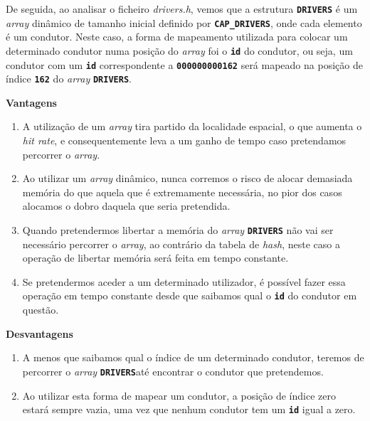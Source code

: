 \documentclass[12pt,a4paper]{report}
\begin{document}
De seguida, ao analisar o ficheiro \textit{drivers.h}, vemos que a estrutura \textbf{\small\texttt{DRIVERS}} é um \textit{array} dinâmico de tamanho inicial definido por \textbf{\small\texttt{CAP\_DRIVERS}}, onde cada elemento é um condutor. Neste caso, a forma de mapeamento utilizada para colocar um determinado condutor numa posição do \textit{array} foi o \textbf{\small\texttt{id}} do condutor, ou seja, um condutor com um \textbf{\small\texttt{id}} correspondente a \textbf{\small\texttt{000000000162}} será mapeado na posição de índice \textbf{\small\texttt{162}} do \textit{array} \textbf{\small\texttt{DRIVERS}}.


\normalsize\textbf{Vantagens}
    \begin{enumerate}
        \item A utilização de um \textit{array} tira partido da localidade espacial, o que aumenta o \textit{hit rate}, e consequentemente leva a um ganho de tempo caso pretendamos percorrer o \textit{array}.
        
        \item Ao utilizar um \textit{array} dinâmico, nunca corremos o risco de alocar demasiada memória do que aquela que é extremamente necessária, no pior dos casos alocamos o dobro daquela que seria pretendida.
        
        \item Quando pretendermos libertar a memória do \textit{array} \textbf{\small\texttt{DRIVERS}} não vai ser necessário percorrer o \textit{array}, ao contrário da tabela de \textit{hash}, neste caso a operação de libertar memória será feita em tempo constante.
        
        \item Se pretendermos aceder a um determinado utilizador, é possível fazer essa operação em tempo constante desde que saibamos qual o \textbf{\small\texttt{id}} do condutor em questão.
    \end{enumerate}

\normalsize\textbf{Desvantagens}
    \begin{enumerate}
        \item A menos que saibamos qual o índice de um determinado condutor, teremos de percorrer o \textit{array} \textbf{\small\texttt{DRIVERS}}até encontrar o condutor que pretendemos.

        \item Ao utilizar esta forma de mapear um condutor, a posição de índice zero estará sempre vazia, uma vez que nenhum condutor tem um \textbf{\small\texttt{id}} igual a zero.
    \end{enumerate}
\end{document}
